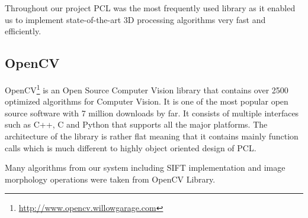 Throughout our project PCL was the most frequently used library as it enabled us to implement state-of-the-art 3D processing algorithms very fast and efficiently.  

\subsection{OpenCV}
OpenCV\footnote{\url{http://www.opencv.willowgarage.com}} is an Open Source Computer Vision library that contains over 2500 optimized algorithms for Computer Vision. It is one of the most popular open source software with 7 million downloads by far. It consists of multiple interfaces such as C++, C and Python that supports all the major platforms. The architecture of the library is rather flat meaning that it contains mainly function calls which is much different to highly object oriented design of PCL.

Many algorithms from our system including SIFT implementation and image morphology operations were taken from OpenCV Library. 








